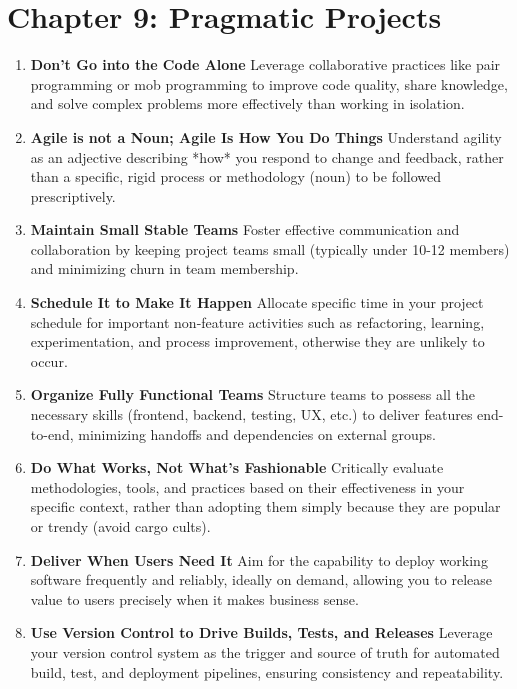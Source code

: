 \documentclass[11pt]{article}
\begin{document}
\newpage

\section*{Chapter 9: Pragmatic Projects}
\begin{enumerate}[label=\arabic*., start=82, itemsep=1ex]
    \item \textbf{Don’t Go into the Code Alone}
    Leverage collaborative practices like pair programming or mob programming to improve code quality, share knowledge, and solve complex problems more effectively than working in isolation.

    \item \textbf{Agile is not a Noun; Agile Is How You Do Things}
    Understand agility as an adjective describing *how* you respond to change and feedback, rather than a specific, rigid process or methodology (noun) to be followed prescriptively.

    \item \textbf{Maintain Small Stable Teams}
    Foster effective communication and collaboration by keeping project teams small (typically under 10-12 members) and minimizing churn in team membership.

    \item \textbf{Schedule It to Make It Happen}
    Allocate specific time in your project schedule for important non-feature activities such as refactoring, learning, experimentation, and process improvement, otherwise they are unlikely to occur.

    \item \textbf{Organize Fully Functional Teams}
    Structure teams to possess all the necessary skills (frontend, backend, testing, UX, etc.) to deliver features end-to-end, minimizing handoffs and dependencies on external groups.

    \item \textbf{Do What Works, Not What's Fashionable}
    Critically evaluate methodologies, tools, and practices based on their effectiveness in your specific context, rather than adopting them simply because they are popular or trendy (avoid cargo cults).

    \item \textbf{Deliver When Users Need It}
    Aim for the capability to deploy working software frequently and reliably, ideally on demand, allowing you to release value to users precisely when it makes business sense.

    \item \textbf{Use Version Control to Drive Builds, Tests, and Releases}
    Leverage your version control system as the trigger and source of truth for automated build, test, and deployment pipelines, ensuring consistency and repeatability.


\end{enumerate}
\end{document}
